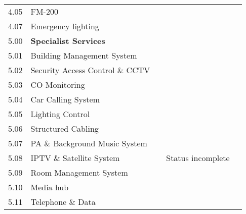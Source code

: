 \begin{fullwidth}
\begin{longtable}{@{}lp{2.8cm} c l p{3.2cm} }
4.05	&FM-200		&&&\\


4.07   & Emergency lighting &&& \\	
\midrule
5.00	&\textbf{Specialist Services}&&\\

5.01	&Building Management System	&&& \\	

5.02	&Security Access Control \& CCTV	&& &\\	

5.03	&CO Monitoring		&&&\\

5.04	&Car Calling System		&&&\\

5.05	&Lighting Control		&&&\\

5.06	&Structured Cabling		&&&\\

5.07	&PA \& Background Music System &&&\\		

5.08	&IPTV \& Satellite System	&&Status incomplete& \\	
5.09	&Room Management System	&&& \\
5.10 &Media hub && & \\
5.11 &Telephone \& Data &&&\\

\bottomrule
\end{longtable}
\end{fullwidth}

